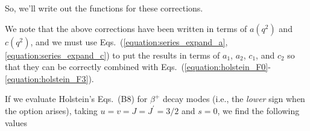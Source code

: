 

So, we'll write out the functions for these corrections.  
\unskip
\unskip
\unskip

We note that the above corrections have been written in terms of $a(q^2)$ and $c(q^2)$, and we must use Eqs.~(\ref{equation:series_expand_a}, \ref{equation:series_expand_c}) to put the results in terms of $a_1$,  $a_2$, $c_1$, and $c_2$ so that they can be correctly combined with Eqs.~(\ref{equation:holstein_F0}-\ref{equation:holstein_F3}).

If we evaluate Holstein's Eqs.~(B8) for $\beta^+$ decay modes (i.e., the \emph{lower} sign when the option arises), taking
$u=v=J=J^\prime=3/2$ and $s=0$, we find the following values
\unskip  %


